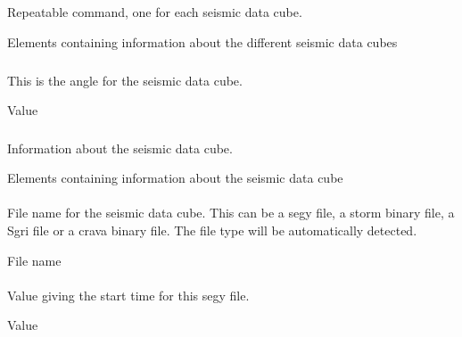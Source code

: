 \subsection{\necessary}
 \slist
   \item \Description Repeatable command, one for each seismic data cube.
   \item \Argument Elements containing information about the different seismic data cubes
   \item \Default
 \elist

\subsubsection{\necessary}
 \slist
   \item \Description This is the angle for the seismic data cube.
   \item \Argument Value
   \item \Default
 \elist

\subsubsection{\necessary}
 \slist
   \item \Description Information about the seismic data cube.
   \item \Argument Elements containing information about the seismic data cube
   \item \Default
 \elist

\paragraph{\necessary}
 \slist
   \item \Description File name for the seismic data cube. This can be
     a segy file, a storm binary file, a Sgri file or a crava binary file. The file
     type will be automatically detected.
   \item \Argument File name
   \item \Default
 \elist

\paragraph{}
 \slist
   \item \Description Value giving the start time for this segy file.
   \item \Argument Value
   \item \Default
 \elist

